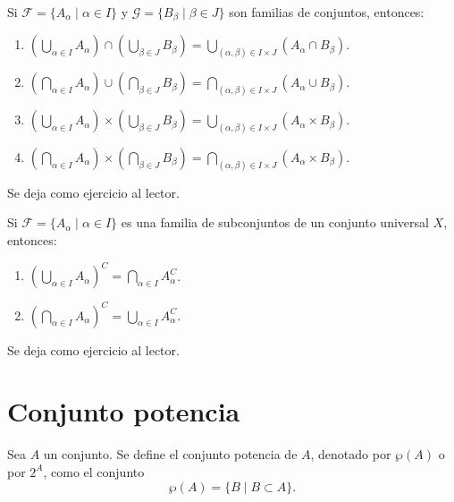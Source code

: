 \begin{theorem}{}{}
    Si $\mathcal{F} = \{A_\alpha \mid \alpha \in I\}$ y $\mathcal{G} = \{B_\beta \mid \beta \in J\}$ son familias de conjuntos, entonces:
    \begin{enumerate}[label=\roman*., topsep=6pt, itemsep=0pt]
        \item $\displaystyle \left(\bigcup_{\alpha \in I} A_\alpha\right) \cap \left(\bigcup_{\beta \in J} B_\beta\right)=\bigcup_{(\alpha,  \beta) \in I \times J} \left(A_\alpha \cap B_\beta\right)$.
        \item $\displaystyle \left(\bigcap_{\alpha \in I} A_\alpha\right) \cup \left(\bigcap_{\beta \in J} B_\beta\right)=\bigcap_{(\alpha,  \beta) \in I \times J}\left(A_\alpha \cup B_\beta\right)$.
        \item $\displaystyle \left(\bigcup_{\alpha \in I} A_\alpha\right) \times \left(\bigcup_{\beta \in J} B_\beta\right)=\bigcup_{(\alpha,  \beta) \in I \times J} \left(A_\alpha \times B_\beta\right)$.
        \item $\displaystyle \left(\bigcap_{\alpha \in I} A_\alpha\right) \times \left(\bigcap_{\beta \in J} B_\beta\right)=\bigcap_{(\alpha,  \beta) \in I \times J}\left(A_\alpha \times B_\beta\right)$.
    \end{enumerate}
    \tcblower
    \demostracion Se deja como ejercicio al lector.
\end{theorem}

\newpage

\begin{theorem}{}{}
    Si $\mathcal{F} = \{A_\alpha \mid \alpha \in I\}$ es una familia de subconjuntos de un conjunto universal $X$, entonces:
    \begin{enumerate}[label=\roman*., topsep=6pt, itemsep=0pt]
        \item $\displaystyle \left(\bigcup_{\alpha \in I} A_\alpha\right)^C = \bigcap_{\alpha \in I} A_\alpha^C$.
        \item $\displaystyle \left(\bigcap_{\alpha \in I} A_\alpha\right)^C = \bigcup_{\alpha \in I} A_\alpha^C$.
    \end{enumerate}
    \tcblower
    \demostracion Se deja como ejercicio al lector.
\end{theorem}

\section{Conjunto potencia}

\begin{definicion}{}{}
    Sea $A$ un conjunto. Se define el conjunto potencia de $A$, denotado por $\wp(A)$ o por $2^A$, como el conjunto
    $$\wp(A) = \{B \mid B \subset A\}.$$
\end{definicion}

